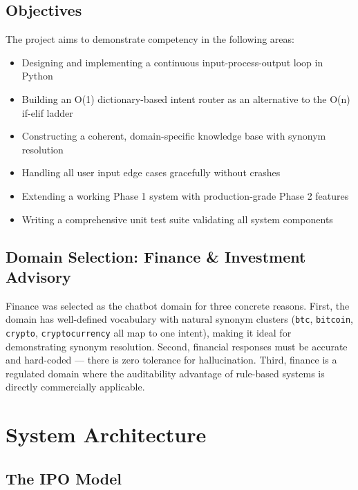 \documentclass[12pt, a4paper]{article}
\begin{document}
\subsection{Objectives}

The project aims to demonstrate competency in the following areas:
\begin{itemize}[noitemsep]
  \item Designing and implementing a continuous input-process-output loop in Python
  \item Building an O(1) dictionary-based intent router as an alternative to the O(n) if-elif ladder
  \item Constructing a coherent, domain-specific knowledge base with synonym resolution
  \item Handling all user input edge cases gracefully without crashes
  \item Extending a working Phase 1 system with production-grade Phase 2 features
  \item Writing a comprehensive unit test suite validating all system components
\end{itemize}

\subsection{Domain Selection: Finance \& Investment Advisory}

Finance was selected as the chatbot domain for three concrete reasons. First,
the domain has well-defined vocabulary with natural synonym clusters
(\texttt{btc}, \texttt{bitcoin}, \texttt{crypto}, \texttt{cryptocurrency} all
map to one intent), making it ideal for demonstrating synonym resolution.
Second, financial responses must be accurate and hard-coded --- there is zero
tolerance for hallucination. Third, finance is a regulated domain where the
auditability advantage of rule-based systems is directly commercially applicable.

\section{System Architecture}

\subsection{The IPO Model}
\end{document}
